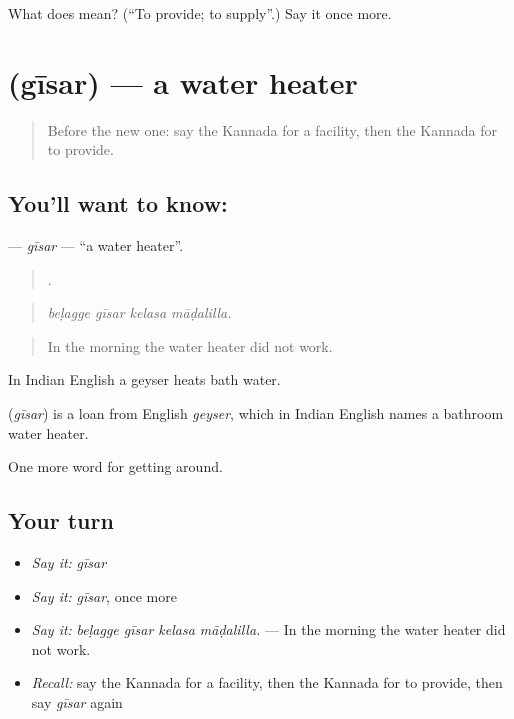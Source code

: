 \begin{tcolorbox}[breakable,colback=teal!4,colframe=teal!35!black,title={Before you move on}]
What does  mean? (\textquotedblleft{}To provide; to supply\textquotedblright{}.) Say it once more.
\end{tcolorbox}
\section[\texorpdfstring{\kn{ಗೀಸರ್} (gīsar)}{ಗೀಸರ್ (gīsar)}]{ (gīsar) — a water heater}

\label{lesson:KA-C463-gisar}



\begin{quote}
Before the new one: say the Kannada for a facility, then the Kannada for to provide.
\end{quote}

\subsection*{You'll want to know: }
\textbf{} — \emph{gīsar} — \textquotedblleft{}a water heater\textquotedblright{}.

\begin{quote}
   .
\end{quote}

\begin{quote}
\emph{beḷagge gīsar kelasa māḍalilla.}
\end{quote}

\begin{quote}
In the morning the water heater did not work.
\end{quote}

In Indian English a geyser heats bath water.

\begin{cousinweb}
\textbf{} (\emph{gīsar}) is a loan from English \emph{geyser}, which in Indian English names a bathroom water heater.
\end{cousinweb}

\begin{grammarlens}[title={What you've built}]
One more word for getting around.
\end{grammarlens}

\subsection*{Your turn}
\begin{itemize}
\raggedright
  \item \emph{Say it:} \emph{gīsar}
  \item \emph{Say it:} \emph{gīsar}, once more
  \item \emph{Say it:} \emph{beḷagge gīsar kelasa māḍalilla.} — In the morning the water heater did not work.
  \item \emph{Recall:} say the Kannada for a facility, then the Kannada for to provide, then say \emph{gīsar} again
\end{itemize}

